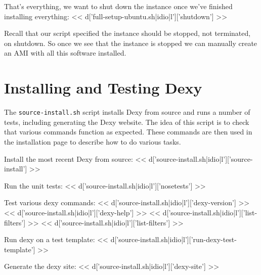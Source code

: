 \documentclass{tufte-handout}
\begin{document}
That's everything, we want to shut down the instance once we've finished installing everything:
<< d['full-setup-ubuntu.sh|idio|l']['shutdown'] >>

Recall that our script specified the instance should be stopped, not terminated, on shutdown. So once we see that the instance is stopped we can manually create an AMI with all this software installed.

\section{Installing and Testing Dexy}

The \verb=source-install.sh= script installs Dexy from source and runs a number of tests, including generating the Dexy website. The idea of this script is to check that various commands function as expected. These commands are then used in the installation page to describe how to do various tasks.

Install the most recent Dexy from source:
<< d['source-install.sh|idio|l']['source-install'] >>

Run the unit tests:
<< d['source-install.sh|idio|l']['nosetests'] >>

Test various dexy commands:
<< d['source-install.sh|idio|l']['dexy-version'] >>
<< d['source-install.sh|idio|l']['dexy-help'] >>
<< d['source-install.sh|idio|l']['list-filters'] >>
<< d['source-install.sh|idio|l']['list-filters'] >>

Run dexy on a test template:
<< d['source-install.sh|idio|l']['run-dexy-test-template'] >>

Generate the dexy site:
<< d['source-install.sh|idio|l']['dexy-site'] >>
\end{document}
